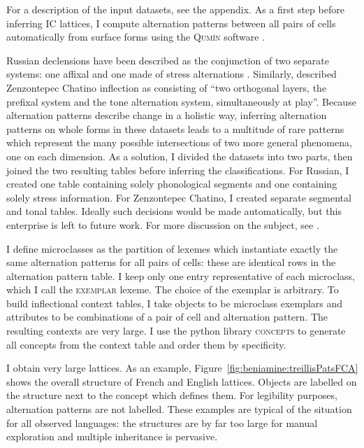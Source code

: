 \documentclass[output=paper]{langscibook}
\begin{document}
    For a description of the input datasets, see the appendix. As a first step before inferring IC lattices, I compute alternation patterns between all pairs of cells automatically from surface forms using the \textsc{Qumín} software \citep{Beniamine2017,BeniaminePhd}.  
    
    Russian declensions have been described as the conjunction of two separate systems: one affixal and one made of stress alternations \citep{BrownHippisley2012}. Similarly, \citet{Campbell2016} described Zenzontepec Chatino inflection as consisting of ``two orthogonal layers, the prefixal system and the tone alternation system, simultaneously at play''. Because alternation patterns describe change in a holistic way, inferring alternation patterns on whole forms in these datasets leads to a multitude of rare patterns which represent the many possible intersections of two more general phenomena, one on each dimension. As a solution, I divided the datasets into two parts, then joined the two resulting tables before inferring the classifications. For Russian, I created one table containing solely phonological segments and one containing solely stress information. For Zenzontepec Chatino, I created separate segmental and tonal tables. Ideally such decisions would be made automatically, but this enterprise is left to future work. For more discussion on the subject, see \citet{BeniaminePhd}. 
    
    I define microclasses as the partition of lexemes which instantiate exactly the same alternation patterns for all pairs of cells: these are identical rows in the alternation pattern table. I keep only one entry representative of each microclass, which I call the \textsc{exemplar} lexeme. The choice of the exemplar is arbitrary. To build inflectional context tables, I take objects to be microclass exemplars and attributes to be combinations of a pair of cell and alternation pattern. The resulting contexts are very large. I use the python library \textsc{concepts} \citep{Bank2016} to generate all concepts from the context table and order them by specificity.
    
    I obtain very large lattices. As an example, Figure~\ref{fig:beniamine:treillisPatsFCA} shows the overall structure of French and English lattices. Objects are labelled on the structure next to the concept which defines them. For legibility purposes, alternation patterns are not labelled. These examples are typical of the situation for all observed languages: the structures are by far too large for manual exploration and multiple inheritance is pervasive.
    
\end{document}
